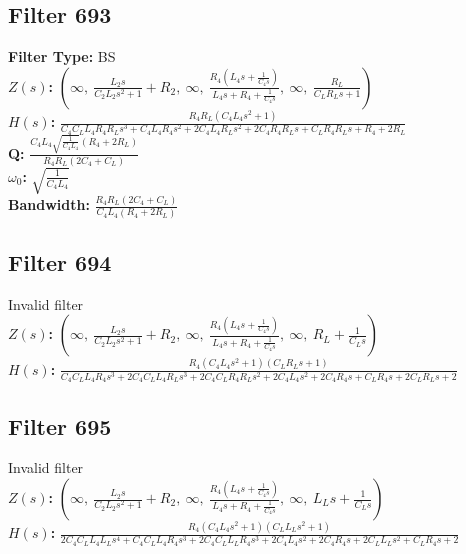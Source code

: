 \documentclass{article}
\begin{document}
\subsection*{Filter 693}
\textbf{Filter Type:} BS \\ 
\textbf{$Z(s)$:} $\left( \infty, \  \frac{L_{2} s}{C_{2} L_{2} s^{2} + 1} + R_{2}, \  \infty, \  \frac{R_{4} \left(L_{4} s + \frac{1}{C_{4} s}\right)}{L_{4} s + R_{4} + \frac{1}{C_{4} s}}, \  \infty, \  \frac{R_{L}}{C_{L} R_{L} s + 1}\right)$ \\ 
\textbf{$H(s)$:} $\frac{R_{4} R_{L} \left(C_{4} L_{4} s^{2} + 1\right)}{C_{4} C_{L} L_{4} R_{4} R_{L} s^{3} + C_{4} L_{4} R_{4} s^{2} + 2 C_{4} L_{4} R_{L} s^{2} + 2 C_{4} R_{4} R_{L} s + C_{L} R_{4} R_{L} s + R_{4} + 2 R_{L}}$ \\ 
\textbf{Q:} $\frac{C_{4} L_{4} \sqrt{\frac{1}{C_{4} L_{4}}} \left(R_{4} + 2 R_{L}\right)}{R_{4} R_{L} \left(2 C_{4} + C_{L}\right)}$ \\ 
\textbf{$\omega_0$:} $\sqrt{\frac{1}{C_{4} L_{4}}}$ \\ 
\textbf{Bandwidth:} $\frac{R_{4} R_{L} \left(2 C_{4} + C_{L}\right)}{C_{4} L_{4} \left(R_{4} + 2 R_{L}\right)}$ \\ 
\subsection*{Filter 694}
Invalid filter \\ 
\textbf{$Z(s)$:} $\left( \infty, \  \frac{L_{2} s}{C_{2} L_{2} s^{2} + 1} + R_{2}, \  \infty, \  \frac{R_{4} \left(L_{4} s + \frac{1}{C_{4} s}\right)}{L_{4} s + R_{4} + \frac{1}{C_{4} s}}, \  \infty, \  R_{L} + \frac{1}{C_{L} s}\right)$ \\ 
\textbf{$H(s)$:} $\frac{R_{4} \left(C_{4} L_{4} s^{2} + 1\right) \left(C_{L} R_{L} s + 1\right)}{C_{4} C_{L} L_{4} R_{4} s^{3} + 2 C_{4} C_{L} L_{4} R_{L} s^{3} + 2 C_{4} C_{L} R_{4} R_{L} s^{2} + 2 C_{4} L_{4} s^{2} + 2 C_{4} R_{4} s + C_{L} R_{4} s + 2 C_{L} R_{L} s + 2}$ \\ 
\subsection*{Filter 695}
Invalid filter \\ 
\textbf{$Z(s)$:} $\left( \infty, \  \frac{L_{2} s}{C_{2} L_{2} s^{2} + 1} + R_{2}, \  \infty, \  \frac{R_{4} \left(L_{4} s + \frac{1}{C_{4} s}\right)}{L_{4} s + R_{4} + \frac{1}{C_{4} s}}, \  \infty, \  L_{L} s + \frac{1}{C_{L} s}\right)$ \\ 
\textbf{$H(s)$:} $\frac{R_{4} \left(C_{4} L_{4} s^{2} + 1\right) \left(C_{L} L_{L} s^{2} + 1\right)}{2 C_{4} C_{L} L_{4} L_{L} s^{4} + C_{4} C_{L} L_{4} R_{4} s^{3} + 2 C_{4} C_{L} L_{L} R_{4} s^{3} + 2 C_{4} L_{4} s^{2} + 2 C_{4} R_{4} s + 2 C_{L} L_{L} s^{2} + C_{L} R_{4} s + 2}$ \\ 
\end{document}
